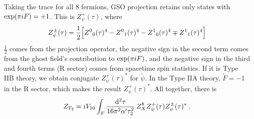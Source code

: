 	Taking the trace for all 8 fermions, GSO projection retains only states with $\exp(\pi i F)=+1$. This is $Z_{\psi}^{+}(\tau)$, where
	\begin{equation}
		Z_{\psi}^{\pm}(\tau) = \frac{1}{2} \Bigl[Z^{0}{}_{0}(\tau)^{4}-Z^{0}{}_{1}(\tau)^{4}-Z^{1}{}_{0}(\tau)^{4}\mp Z^{1}{}_{1}(\tau)^{4} \Bigr] \label{10.7.9}
	\end{equation}
	$\frac{1}{2}$ comes from the projection operator, the negative sign in the second term comes from the ghost field's contribution to $\exp(\pi i F)$, and the negative sign in the third and fourth terms (R sector) comes from spacetime spin statistics. If it is Type IIB theory, we obtain conjugate $Z_{\psi}^{+}(\tau)^{\ast}$ for $\tilde{\psi}$. In the Type IIA theory, $\tilde{F}=-1$ in the R sector, which makes the result $Z_{\psi}^{+}(\tau)^{\ast}$. All together, there is
	\begin{equation}
		Z_{T_{2}} = i V_{10} \int_{F}\frac{\mathrm{d}^{2}\tau}{16\pi^{2}\alpha^{\prime}\tau_{2}^{2}}\:Z_{X}^{8}Z_{\psi}^{+}(\tau)Z_{\psi}^{\pm}(\tau)^{\ast} \:. \label{10.7.10}
	\end{equation}
